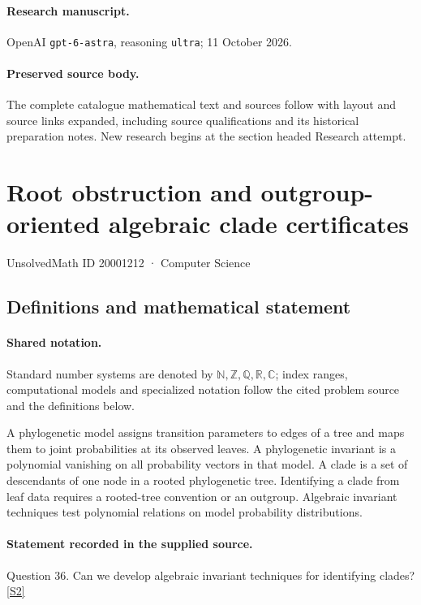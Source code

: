 \documentclass[11pt]{article}
\begin{document}
\paragraph{Research manuscript.} OpenAI \texttt{gpt-6-astra}, reasoning \texttt{ultra}; 11 October 2026.
\paragraph{Preserved source body.} The complete catalogue mathematical text and sources follow with layout and source links expanded, including source qualifications and its historical preparation notes. New research begins at the section headed Research attempt.

\section{Root obstruction and outgroup-oriented algebraic clade certificates}\label{20001212}
{\small UnsolvedMath ID 20001212 · Computer Science}
\subsection{Definitions and mathematical statement}

\paragraph{Shared notation.}Standard number systems are denoted by $\mathbb N,\mathbb Z,\mathbb Q,\mathbb R,\mathbb C$; index ranges, computational models and specialized notation follow the cited problem source and the definitions below.


A phylogenetic model assigns transition parameters to edges of a tree and maps them to joint probabilities at its observed leaves. A phylogenetic invariant is a polynomial vanishing on all probability vectors in that model. A clade is a set of descendants of one node in a rooted phylogenetic tree. Identifying a clade from leaf data requires a rooted-tree convention or an outgroup. Algebraic invariant techniques test polynomial relations on model probability distributions.
\paragraph{Statement recorded in the supplied source.}
Question 36. Can we develop algebraic invariant techniques for identifying clades? \href{https://aimath.org/WWN/compalgstat/compalgstat.pdf}{[S2]}
\end{document}
